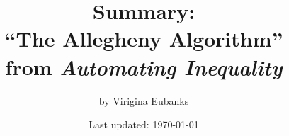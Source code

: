 \documentclass{article}
\title{\textbf{Summary:}\\``The Allegheny Algorithm''\\from \textit{Automating Inequality}}
\author{by Virigina Eubanks}
\date{Last updated: \today}
\begin{document}
\maketitle

\tableofcontents
\newpage

\section{}




\end{document}

